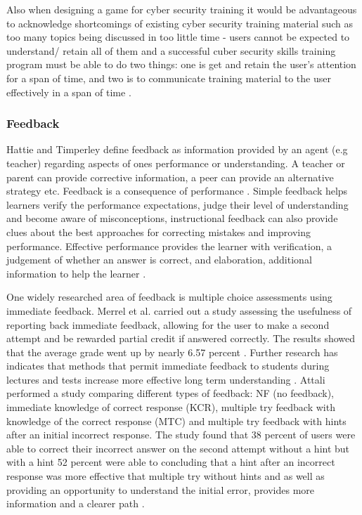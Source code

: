 \documentclass[12pt,a4paper]{article}
\begin{document}
Also when designing a game for cyber security training it would be advantageous to acknowledge shortcomings of existing cyber security training material such as too many topics being discussed in too little time - users cannot be expected to understand/ retain all of them and a successful cuber security skills training program must be able to do two things: one is get and retain the user's attention for a span of time, and two is to communicate training material to the user effectively in a span of time \cite{nagarajan2012exploring5}. 

\subsubsection{Feedback} 
Hattie and Timperley define feedback as information provided by an agent (e.g teacher) regarding aspects of ones performance or understanding. A teacher or parent can provide corrective information, a peer can provide an alternative strategy etc. Feedback is a consequence of performance \cite{hattie2007power}. Simple feedback helps learners verify the performance expectations, judge their level of understanding and become aware of misconceptions, instructional feedback can also provide clues about the best approaches for correcting mistakes and improving performance. Effective performance provides the learner with verification, a judgement of whether an answer is correct, and elaboration, additional information to help the learner \cite{attali2015effects1}.  

One widely researched area of feedback is multiple choice assessments using immediate feedback. Merrel et al. carried out a study assessing the usefulness of reporting back immediate feedback, allowing for the user to make a second attempt and be rewarded partial credit if answered correctly. The results showed that the average grade went up by nearly 6.57 percent \cite{merrel2015multiple}. Further research has indicates that methods that permit immediate feedback to students during lectures and tests increase more effective long term understanding \cite{roediger2011critical}. Attali performed a study comparing different types of feedback: NF (no feedback), immediate knowledge of correct response (KCR), multiple try feedback with knowledge of the correct response (MTC) and multiple try feedback with hints after an initial incorrect response. The study found that 38 percent of users were able to correct their incorrect answer on the second attempt without a hint but with a hint 52 percent were able to concluding that a hint after an incorrect response was more effective that multiple try without hints and as well as providing an opportunity to understand the initial error, provides more information and a clearer path \cite{attali2015effects2}.      
\end{document}
